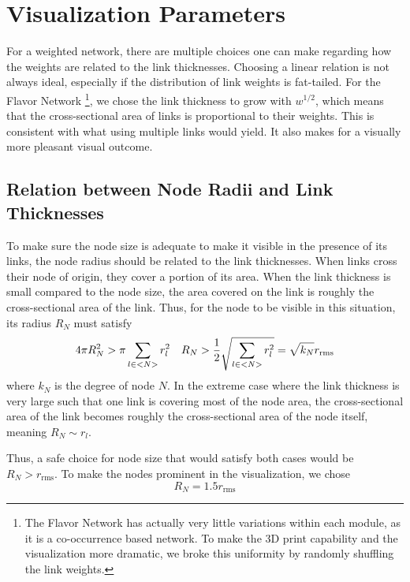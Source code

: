 \documentclass[endfloats,nofootinbib,preprint,floatfix,titlepage,superscriptaddress,linenumbers]{revtex4-1} %
\begin{document}
\section{Visualization Parameters\label{ap:params}}
For a weighted network, there are multiple choices one can make regarding how the weights are related to the link thicknesses.
Choosing a linear relation is not always ideal, especially if the distribution of link weights is fat-tailed. 
For the Flavor Network \citep{ahn2011flavor}\footnote{The Flavor Network has actually very little variations within each module, as it is a co-occurrence based network. To make the 3D print capability and the visualization more dramatic, we broke this uniformity by randomly shuffling the link weights.}, we chose the link thickness to grow with $w^{1/2}$, which means that the cross-sectional area of links is proportional to their weights. 
This is consistent with what using multiple links would yield. 
It also makes for a  visually more pleasant visual outcome. 



\subsection{Relation between Node Radii and Link Thicknesses}
To make sure the node size is adequate to make it visible in the presence of its links, the node radius should be related to the link thicknesses. 
When links cross their node of origin, they cover a portion of its area.
When the link thickness is small compared to the node size, the area covered on the link is roughly the cross-sectional area of the link. 
Thus, for the node to be visible in this situation, its radius $R_N$ must satisfy
\begin{equation}
    4 \pi R_N^2 > \pi \sum_{l\in <N>} r_l^2 \quad R_N > {1\over 2} \sqrt{\sum_{l\in <N>} r_l^2} = \sqrt{k_N} r_{\mathrm{rms}}  
\end{equation}
where $k_N$ is the degree of node $N$.  
In the extreme case where the link thickness is very large such that one link is covering most of the node area, the cross-sectional area of the link becomes roughly the cross-sectional area of the node itself, meaning $R_N \sim r_l$. 

Thus, a safe choice for node size that would satisfy both cases would be 
$R_N > r_{\mathrm{rms}}$.
To make the nodes prominent in the visualization, we chose 
\[R_N = 1.5 r_{\mathrm{rms}}\]
\end{document}
